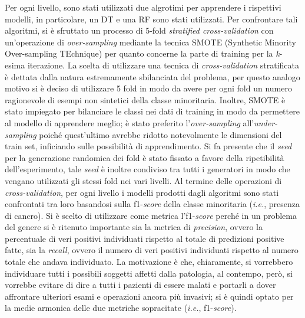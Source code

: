 Per ogni livello, sono stati utilizzati due algrotimi per apprendere i rispettivi modelli, in particolare, un DT e una RF sono stati utilizzati.
Per confrontare tali algoritmi,  si è sfruttato un processo di 5-fold \textit{stratified cross-validation} con un'operazione di \textit{over-sampling} mediante la tecnica SMOTE (Synthetic Minority Over-sampling TEchnique) per quanto concerne la parte di training per la \textit{k}-esima iterazione.
La scelta di utilizzare una tecnica di \textit{cross-validation} stratificata è dettata dalla natura estremamente sbilanciata del problema, per questo analogo motivo si è deciso di utilizzare 5 fold in modo da avere per ogni fold un numero ragionevole di esempi non sintetici della classe minoritaria.
Inoltre, SMOTE è stato impiegato per bilanciare le classi nei dati di training in modo da permettere al modello di apprendere meglio; è stato preferito l'\textit{over-sampling} all'\textit{under-sampling} poiché quest'ultimo avrebbe ridotto notevolmente le dimensioni del train set, inficiando sulle possibilità di apprendimento.
Si fa presente che il \textit{seed} per la generazione randomica dei fold è stato fissato a favore della ripetibilità dell'esperimento, tale \textit{seed} è inoltre condiviso tra tutti i generatori in modo che vengano utilizzati gli stessi fold nei vari livelli.
Al termine delle operazioni di \textit{cross-validation}, per ogni livello i modelli prodotti dagli algoritmi sono stati confrontati tra loro basandosi sulla f1-\textit{score} della classe minoritaria (\textit{i.e.}, presenza di cancro).
Si è scelto di utilizzare come metrica l'f1-\textit{score} perché in un problema del genere si è ritenuto importante sia la metrica di \textit{precision}, ovvero la percentuale di veri positivi individuati rispetto al totale di predizioni positive fatte, sia la \textit{recall}, ovvero il numero di veri positivi individuati rispetto al numero totale che andava individuato. 
La motivazione è che, chiaramente, si vorrebbero individuare tutti i possibili soggetti affetti dalla patologia, al contempo, però, si vorrebbe evitare di dire a tutti i pazienti di essere malati e portarli a dover affrontare ulteriori esami e operazioni ancora più invasivi; si è quindi optato per la medie armonica delle due metriche sopracitate (\textit{i.e.}, f1-\textit{score}).
